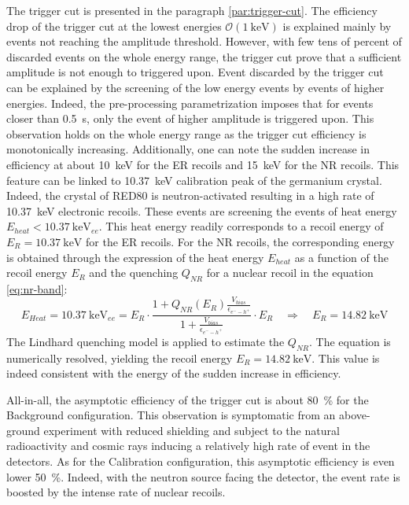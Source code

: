 The trigger cut is presented in the paragraph \ref{par:trigger-cut}. The efficiency drop of the trigger cut at the lowest energies $\mathcal{O}(\SI{1}{\kilo\eV})$ is explained mainly  by events not reaching the amplitude threshold. However, with few tens of percent of discarded events on the whole energy range, the trigger cut prove that a sufficient amplitude is not enough to triggered upon. Event discarded by the trigger cut can be explained by the screening of the low energy events by events of higher energies. Indeed, the pre-processing parametrization imposes that for events closer than \SI{0.5}{\s}, only the event of higher amplitude is triggered upon. This observation holds on the whole energy range as the trigger cut efficiency is monotonically increasing.
Additionally, one can note the sudden increase in efficiency at about \SI{10}{\kilo\eV} for the ER recoils and \SI{15}{\kilo\eV} for the NR recoils. This feature can be linked to \SI{10.37}{\kilo\eV} calibration peak of the germanium crystal. Indeed,  the crystal of RED80 is neutron-activated resulting in a high rate of \SI{10.37}{\kilo\eV} electronic recoils. These events are screening the events of heat energy $E_{heat} < \SI{10.37}{\kilo\eV}_{ee}$. This heat energy readily corresponds to a recoil energy of $E_R=\SI{10.37}{\kilo\eV}$ for the ER recoils. For the NR recoils, the corresponding energy is obtained through the expression of the heat energy $E_{heat}$ as a function of the recoil energy $E_R$ and the quenching $Q_{NR}$ for a nuclear recoil in the equation \ref{eq:nr-band}:
\begin{equation}
\label{eq:15kev-enigma}
E_{Heat} = \SI{10.37}{\kilo\eV}_{ee} 
= 
E_R 
\cdot
\frac{
1 + Q_{NR} \left( E_R \right)\frac{V_{bias}}{\epsilon_{e^--h^+}}
}{
1 + \frac{V_{bias}}{\epsilon_{e^--h^+}}
} \cdot E_R
\quad \Rightarrow \quad
E_R = \SI{14.82}{\kilo\eV}
\end{equation}
The Lindhard quenching model is applied to estimate the $Q_{NR}$. The equation is numerically resolved, yielding the recoil energy $E_R = \SI{14.82}{\kilo\eV}$. This value is indeed consistent with the energy of the sudden increase in efficiency.

All-in-all, the asymptotic efficiency of the trigger cut is about \SI{80}{\percent} for the Background configuration. This observation is symptomatic from an above-ground experiment with reduced shielding and subject to the natural radioactivity and cosmic rays inducing a relatively high rate of event in the detectors. As for the Calibration configuration, this asymptotic efficiency is even lower \SI{50}{\percent}. Indeed, with the neutron source facing the detector, the event rate is boosted by the intense rate of nuclear recoils.

